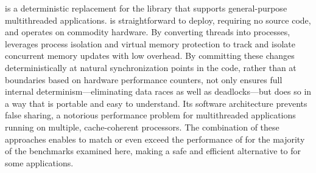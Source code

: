 \label{sec:conclusion}

\dthreads{} is a deterministic replacement for the \pthreads{}
library that supports general-purpose multithreaded
applications. \dthreads{} is straightforward to deploy, requiring no
source code, and operates on commodity hardware. By converting threads
into processes, \dthreads{} leverages process isolation and virtual
memory protection to track and isolate concurrent memory updates with
low overhead. By committing these changes deterministically at natural
synchronization points in the code, rather than at boundaries based on
hardware performance counters, \dthreads{} not only ensures full
internal determinism---eliminating data races as well as
deadlocks---but does so in a way that is portable and easy to
understand. Its software architecture prevents false sharing, a
notorious performance problem for multithreaded applications running
on multiple, cache-coherent processors. The combination of these
approaches enables \dthreads{} to match or even exceed the performance
of \pthreads{} for the majority of the benchmarks examined here,
making \dthreads{} a safe and efficient alternative to \pthreads{} for
some applications.
